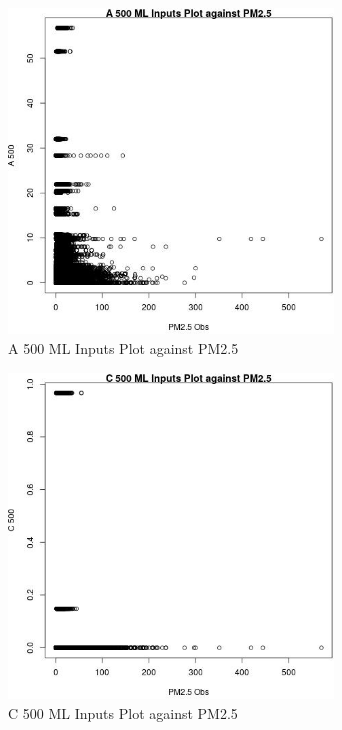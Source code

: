 \clearpage 

\begin{figure} 
\centering  
\includegraphics[width=0.77\textwidth]{Code_Outputs/ML_input_report_ML_input_PM25_Step5_part_d_de_duplicated_aves_ML_input_A_500vPM25_Obs.jpg} 
\caption{\label{fig:ML_input_report_ML_input_PM25_Step5_part_d_de_duplicated_aves_ML_inputA_500vPM25_Obs}A 500 ML Inputs Plot against PM2.5} 
\end{figure} 
 

\begin{figure} 
\centering  
\includegraphics[width=0.77\textwidth]{Code_Outputs/ML_input_report_ML_input_PM25_Step5_part_d_de_duplicated_aves_ML_input_C_500vPM25_Obs.jpg} 
\caption{\label{fig:ML_input_report_ML_input_PM25_Step5_part_d_de_duplicated_aves_ML_inputC_500vPM25_Obs}C 500 ML Inputs Plot against PM2.5} 
\end{figure} 
 

